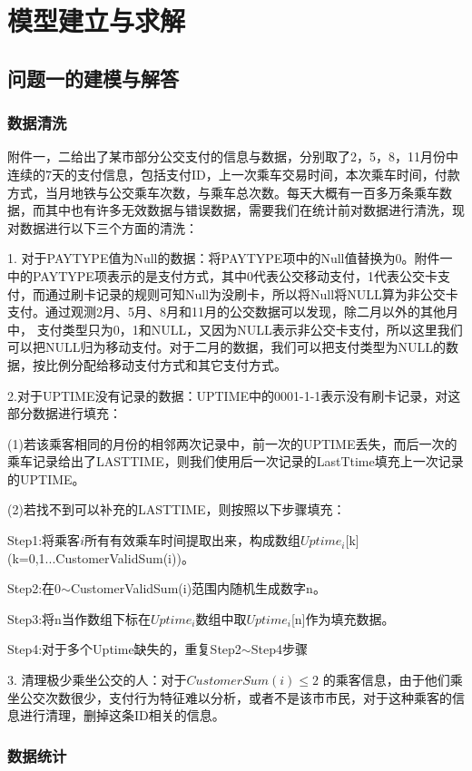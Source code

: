 \documentclass[withoutpreface,bwprint]{cumcmthesis} %
\begin{document}
\section{模型建立与求解}
\subsection{问题一的建模与解答}
\subsubsection{数据清洗}
附件一，二给出了某市部分公交支付的信息与数据，分别取了2，5，8，11月份中连续的7天的支付信息，包括支付ID，上一次乘车交易时间，本次乘车时间，付款方式，当月地铁与公交乘车次数，与乘车总次数。每天大概有一百多万条乘车数据，而其中也有许多无效数据与错误数据，需要我们在统计前对数据进行清洗，现对数据进行以下三个方面的清洗：

1. 对于PAYTYPE值为Null的数据：将PAYTYPE项中的Null值替换为0。附件一中的PAYTYPE项表示的是支付方式，其中0代表公交移动支付，1代表公交卡支付，而通过刷卡记录的规则可知Null为没刷卡，所以将Null将NULL算为非公交卡支付。通过观测2月、5月、8月和11月的公交数据可以发现，除二月以外的其他月中，
支付类型只为0，1和NULL，又因为NULL表示非公交卡支付，所以这里我们可以把NULL归为移动支付。对于二月的数据，我们可以把支付类型为NULL的数据，按比例分配给移动支付方式和其它支付方式。

2.对于UPTIME没有记录的数据：UPTIME中的0001-1-1表示没有刷卡记录，对这部分数据进行填充：

(1)若该乘客相同的月份的相邻两次记录中，前一次的UPTIME丢失，而后一次的乘车记录给出了LASTTIME，则我们使用后一次记录的LastTtime填充上一次记录的UPTIME。

(2)若找不到可以补充的LASTTIME，则按照以下步骤填充：

Step1:将乘客$i$所有有效乘车时间提取出来，构成数组$Uptime_i$[k](k=0,1...CustomerValidSum(i))。

Step2:在0$\sim$CustomerValidSum(i)范围内随机生成数字n。

Step3:将n当作数组下标在$Uptime_i$数组中取$Uptime_i$[n]作为填充数据。

Step4:对于多个Uptime缺失的，重复Step2$\sim$Step4步骤

3. 清理极少乘坐公交的人：对于$CustomerSum(i)\leq2$ 的乘客信息，由于他们乘坐公交次数很少，支付行为特征难以分析，或者不是该市市民，对于这种乘客的信息进行清理，删掉这条ID相关的信息。

\subsubsection{数据统计}
\end{document}

